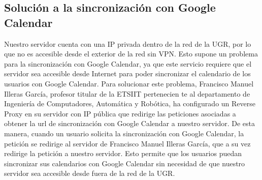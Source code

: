 \subsection{Solución a la sincronización con Google Calendar}

Nuestro servidor cuenta con una IP privada dentro de la red de la UGR, por lo que no es accesible desde el exterior de la red sin VPN. Esto supone un problema para la sincronización con Google Calendar, ya que este servicio requiere que el servidor sea accesible desde Internet para poder sincronizar el calendario de los usuarios con Google Calendar.
\newline\newline
Para solucionar este problema, Francisco Manuel Illeras García, profesor titular de la ETSIIT pertenecien te al departamento de Ingeniería de Computadores, Automática y Robótica, ha configurado un Reverse Proxy en su servidor con IP pública que redirige las peticiones asociadas a obtener la url de sincronización con Google Calendar a nuestro servidor. De esta manera, cuando un usuario solicita la sincronización con Google Calendar, la petición se redirige al servidor de Francisco Manuel Illeras García, que a su vez redirige la petición a nuestro servidor. Esto permite que los usuarios puedan sincronizar sus calendarios con Google Calendar sin necesidad de que nuestro servidor sea accesible desde fuera de la red de la UGR.